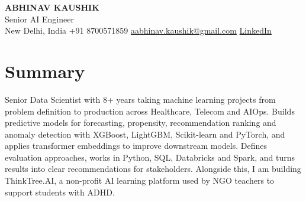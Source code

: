 \documentclass[10pt,a4paper]{article}
\begin{document}
\begin{center}
  {\LARGE\bfseries ABHINAV KAUSHIK}\\[2pt]
  {\large Senior AI Engineer}\\[2pt]
  New Delhi, India \textbar{} +91 8700571859 \textbar{} \href{mailto:aabhinav.kaushik@gmail.com}{aabhinav.kaushik@gmail.com} \textbar{} \href{https://www.linkedin.com/in/abhinav-kaushik10/}{LinkedIn}  
\end{center}

\section{Summary}
Senior Data Scientist with 8+ years taking machine learning projects from problem definition to production across Healthcare, Telecom and AIOps. Builds predictive models for forecasting, propensity, recommendation ranking and anomaly detection with XGBoost, LightGBM, Scikit-learn and PyTorch, and applies transformer embeddings to improve downstream models. Defines evaluation approaches, works in Python, SQL, Databricks and Spark, and turns results into clear recommendations for stakeholders. Alongside this, I am building ThinkTree.AI, a non-profit AI learning platform used by NGO teachers to support students with ADHD.
\end{document}
